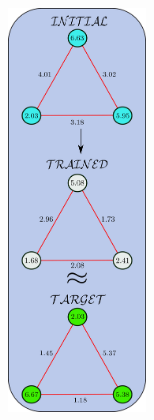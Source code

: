 \begin{figure}
\centering
\begin{subfigure}[t]{0.45\textwidth}
    \centering
    \includegraphics[width=0.4\textwidth, height = 0.9\textwidth]{images/FIG_S5a_circuit_init_three_qubits_vertical_compressed.pdf}
    \caption{}\label{subfig:auto_comp_3_params}
\end{subfigure}
\begin{subfigure}[t]{0.45\textwidth}
\centering
\end{subfigure}
\end{figure}

